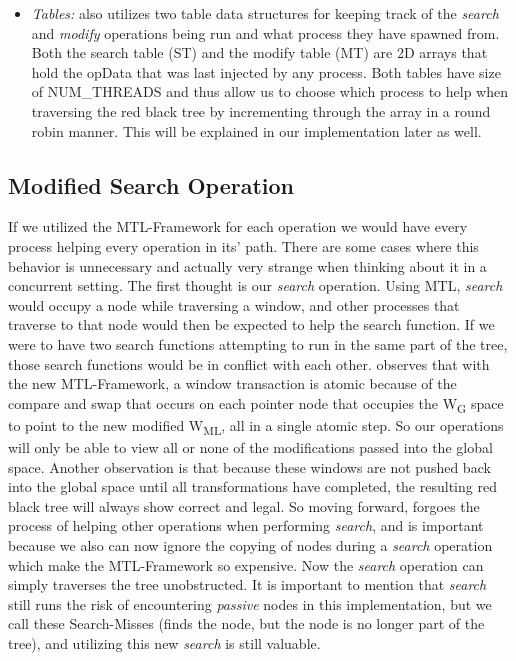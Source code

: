\documentclass[letterpaper, 10 pt, conference]{ieeeconf}
\begin{document}
\begin{itemize}
	\item \textit{Tables:} \cite{c1} also utilizes two table data structures for keeping track of the \textit{search} and \textit{modify} operations being run and what process they have spawned from. Both the search table (ST) and the modify table (MT) are 2D arrays that hold the opData that was last injected by any process. Both tables have size of NUM\_THREADS and thus allow us to choose which process to help when traversing the red black tree by incrementing through the array in a round robin manner. This will be explained in our implementation later as well.
	\end{itemize}

	\subsection{Modified Search Operation}
	If we utilized the MTL-Framework for each operation we would have every process helping every operation in its' path. There are some cases where this behavior is unnecessary and actually very strange when thinking about it in a concurrent setting. The first thought is our \textit{search} operation. Using MTL, \textit{search} would occupy a node while traversing a window, and other processes that traverse to that node would then be expected to help the search function. If we were to have two search functions attempting to run in the same part of the tree, those search functions would be in conflict with each other.
	\cite{1} observes that with the new MTL-Framework, a window transaction is atomic because of the compare and swap that occurs on each pointer node that occupies the W\textsubscript{G} space to point to the new modified W\textsubscript{ML}, all in a single atomic step. So our operations will only be able to view all or none of the modifications passed into the global space. Another observation is that because these windows are not pushed back into the global space until all transformations have completed, the resulting red black tree will always show correct and legal. So moving forward, \cite{c1} forgoes the process of helping other operations when performing \textit{search}, and is important because we also can now ignore the copying of nodes during a \textit{search} operation which make the MTL-Framework so expensive. Now the \textit{search} operation can simply traverses the tree unobstructed. It is important to mention that \textit{search} still runs the risk of encountering \textit{passive} nodes in this implementation, but we call these Search-Misses (finds the node, but the node is no longer part of the tree), and utilizing this new \textit{search} is still valuable.
\end{document}
